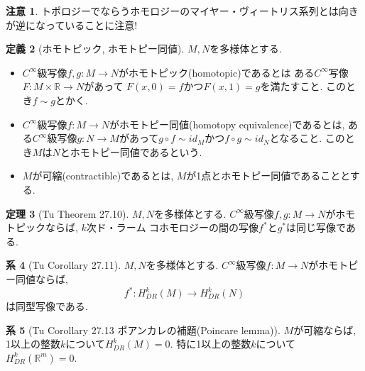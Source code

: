 \documentclass[dvipdfmx,a4paper,11pt]{article}
\newcommand{\R}{\mathbb{R}}
\theoremstyle{definition}
\newtheorem{thm}{定理}
\newtheorem{cor}[thm]{系}
\newtheorem{dfn}[thm]{定義}
\newtheorem{rema}[thm]{注意}
\begin{document}
\begin{rema}
トポロジーでならうホモロジーのマイヤー・ヴィートリス系列とは向きが逆になっていることに注意!
\end{rema}


\begin{tcolorbox}[
    colback = white,
    colframe = green!35!black,
    fonttitle = \bfseries,
    breakable = true]
\begin{dfn}[ホモトピック, ホモトピー同値]
$M,N$を多様体とする. 
\begin{itemize}
 \setlength{\parskip}{0cm}
  \setlength{\itemsep}{2pt}
  \item $C^\infty$級写像$f, g: M \to N$がホモトピック(homotopic)であるとは
ある$C^\infty$写像$F : M \times \R \to N$があって
$F(x,0) = f$かつ$F(x,1)=g$を満たすこと. このとき$f \sim g$とかく. 
\item $C^\infty$級写像$f : M \to N$がホモトピー同値(homotopy equivalence)であるとは, ある$C^\infty$級写像$g : N \to M$があって$g \circ f \sim id_{M}$かつ$f \circ g \sim id_{N}$となること. このとき$M$は$N$とホモトピー同値であるという. 
\item $M$が可縮(contractible)であるとは, $M$が1点とホモトピー同値であることとする. 
\end{itemize}
\end{dfn}
\end{tcolorbox}  

\begin{tcolorbox}[
    colback = white,
    colframe = green!35!black,
    fonttitle = \bfseries,
    breakable = true]
\begin{thm}[Tu Theorem 27.10]
$M,N$を多様体とする. $C^\infty$級写像$f, g: M \to N$がホモトピックならば, $k$次ド・ラーム コホモロジーの間の写像$f^{*}$と$g^{*}$は同じ写像である. 
\end{thm}
\end{tcolorbox} 

\begin{tcolorbox}[
    colback = white,
    colframe = green!35!black,
    fonttitle = \bfseries,
    breakable = true]
\begin{cor}[Tu Corollary 27.11]
$M,N$を多様体とする. $C^\infty$級写像$f : M \to N$がホモトピー同値ならば, 
$$
f^{*} : H^{k}_{DR}(M) \to H^{k}_{DR}(N) 
$$
は同型写像である. 
\end{cor}
\end{tcolorbox} 

\begin{tcolorbox}[
    colback = white,
    colframe = green!35!black,
    fonttitle = \bfseries,
    breakable = true]
\begin{cor}[Tu Corollary 27.13 ポアンカレの補題(Poincare lemma)]
$M$が可縮ならば, 1以上の整数$k$について$H^{k}_{DR}(M) =0$. 
特に1以上の整数$k$について$H^{k}_{DR}(\R^m) =0$.
\end{cor}
\end{tcolorbox} 
\end{document}
